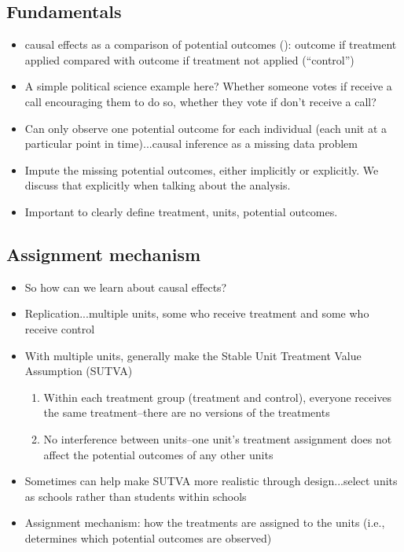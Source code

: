 \documentclass[11pt,titlepage]{article}
\begin{document}
\subsection{Fundamentals}
\begin{itemize}
\item causal effects as a comparison of potential outcomes
  (\cite{Rubin74}): outcome if treatment applied compared with outcome
  if treatment not applied (``control'')
\item A simple political science example here?  Whether someone votes
  if receive a call encouraging them to do so, whether they vote if
  don't receive a call?
\item Can only observe one potential outcome for each individual (each
  unit at a particular point in time)...causal inference as a missing
  data problem
\item Impute the missing potential outcomes, either implicitly or
  explicitly.  We discuss that explicitly when talking about the
  analysis.
\item Important to clearly define treatment, units, potential
  outcomes.
\end{itemize}


\subsection{Assignment mechanism}
\begin{itemize}
\item So how can we learn about causal effects?
\item Replication...multiple units, some who receive treatment and
  some who receive control
\item With multiple units, generally make the Stable Unit Treatment
  Value Assumption (SUTVA)
\begin{enumerate}
\item Within each treatment group (treatment and control), everyone
  receives the same treatment--there are no versions of the treatments
\item No interference between units--one unit's treatment assignment
  does not affect the potential outcomes of any other units
\end{enumerate}
\item Sometimes can help make SUTVA more realistic through
  design...select units as schools rather than students within schools
\item Assignment mechanism: how the treatments are assigned to the
  units (i.e., determines which potential outcomes are observed)
\end{itemize}
\end{document}
